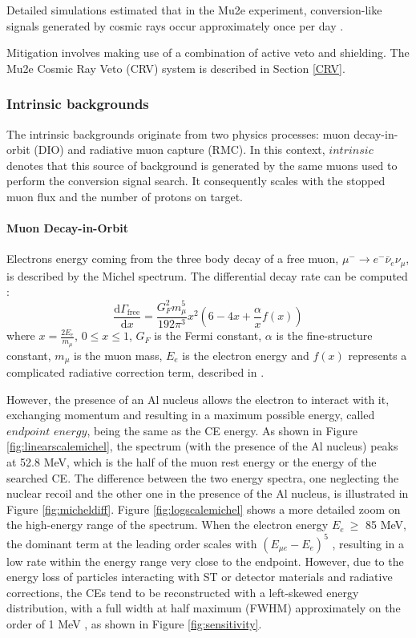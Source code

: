 Detailed simulations estimated that in the Mu2e experiment, 
conversion-like signals generated by cosmic rays occur approximately once per day \cite{CRVposter}.

Mitigation involves making use of a combination of active veto and shielding.
The Mu2e Cosmic Ray Veto (CRV) system is described in Section \ref{CRV}.

\subsubsection{Intrinsic backgrounds}
The intrinsic backgrounds originate from two physics processes: 
muon decay-in-orbit (DIO) and radiative muon capture (RMC). In this context, 
$intrinsic$ denotes that this source of background is generated by the same muons
used to perform the conversion signal search. It consequently scales with the
stopped muon flux and the number of protons on target.


\paragraph{Muon Decay-in-Orbit}
Electrons energy coming from the three body decay of a free muon, 
$\mu^- \rightarrow e^- \bar{\nu}_e \nu_\mu$, is described by the Michel 
spectrum. The differential decay rate can be computed \cite{michel}:
\begin{equation}
    \frac{\text{d}\Gamma_{\text{free}}}{\text{d}x}= \frac{G^2_F m^5_\mu}{192 \pi^3}x^2(6-4x+\frac{\alpha}{x}f(x)) 
\end{equation}
where $x=\frac{2 E_e}{m_\mu}$, $0\leq x\leq 1$, $G_F$ is the Fermi constant, 
$\alpha$ is the fine-structure constant, $m_\mu$ is the muon mass, $E_e$ is the 
electron energy and $f (x)$ represents a complicated radiative correction term, 
described in \cite{PhysRev.113.1652}.

However, the presence of an Al nucleus allows the electron to 
interact with it, exchanging momentum and resulting in a maximum possible energy, called 
$endpoint$ $energy$, being the same as the CE energy. 
As shown in Figure \ref{fig:linearscalemichel}, the spectrum (with the presence of the Al nucleus) peaks at 
52.8 MeV, which is the half of the muon rest energy or the energy of the searched CE.
The difference between the two energy spectra, one neglecting the nuclear recoil and the 
other one in the presence of the Al nucleus, is illustrated in Figure \ref{fig:micheldiff}. 
Figure \ref{fig:logscalemichel} shows a more detailed zoom on the high-energy 
range of the spectrum. When the electron energy $E_e \ \geq$ 85 MeV, the dominant term 
at the leading order scales with $(E_{\mu e} - E_e)^5$ \cite{PhysRevD.84.013006}, 
resulting in a low rate within the energy range very close to the endpoint. However, due to 
the energy loss of particles interacting with ST or detector materials and radiative corrections, 
the CEs tend to be reconstructed with a left-skewed energy distribution,
with a full width at half maximum (FWHM) approximately on the order of 1 MeV 
\cite{gaponenko}, as shown in Figure \ref{fig:sensitivity}.


